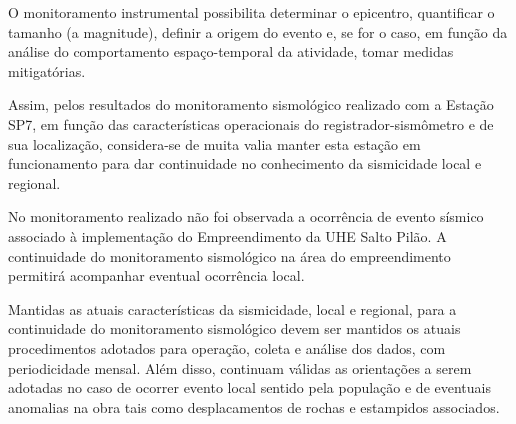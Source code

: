 \par{O monitoramento instrumental possibilita determinar o epicentro, quantificar o tamanho (a magnitude), definir a origem do evento e, se for o caso, em função da análise do comportamento espaço-temporal da atividade, tomar medidas mitigatórias.} 
\par{Assim, pelos resultados do monitoramento sismológico realizado com a Estação SP7, em função das características operacionais do registrador-sismômetro e de sua localização, considera-se de muita valia manter esta estação em funcionamento para dar continuidade no conhecimento da sismicidade local e regional.}
\par{No monitoramento realizado não foi observada a ocorrência de evento sísmico associado à implementação do Empreendimento da UHE Salto Pilão. A continuidade do monitoramento sismológico na área do empreendimento permitirá acompanhar eventual ocorrência local.}
\par{Mantidas as atuais características da sismicidade, local e regional, para a continuidade do monitoramento sismológico devem ser mantidos os atuais procedimentos adotados para operação, coleta e análise dos dados, com periodicidade mensal. Além disso, continuam válidas as orientações a serem adotadas no caso de ocorrer evento local sentido pela população e de eventuais anomalias na obra tais como desplacamentos de rochas e estampidos associados.}

\assinaturaDoisDigitalRelatorio
